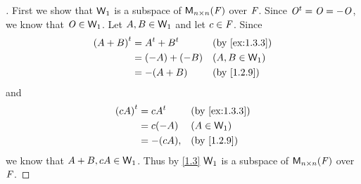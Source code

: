 \begin{proof}[]
	First we show that \(\mathsf{W}_1\) is a subspace of \(\ms[n][n][\F]\) over \(\mathit{F}\).
	Since \({\mathit{O}}^{t} = \mathit{O} = -\mathit{O}\), we know that \(\mathit{O} \in \mathsf{W}_1\).
	Let \(A, B \in \mathsf{W}_1\) and let \(c \in \mathit{F}\).
	Since
	\begin{align*}
		\tp{(A + B)} & = \tp{A} + \tp{B} &  & \by{ex:1.3.3}   \\
		             & = (-A) + (-B)     &  & (A, B \in \W_1) \\
		             & = -(A + B)        &  & \by{1.2.9}
	\end{align*}
	and
	\begin{align*}
		\tp{(cA)} & = c \tp{A} &  & \by{ex:1.3.3} \\
		          & = c (-A)   &  & (A \in \W_1)  \\
		          & = -(cA),   &  & \by{1.2.9}
	\end{align*}
	we know that \(A + B, cA \in \mathsf{W}_1\).
	Thus by \cref{1.3} \(\mathsf{W}_1\) is a subspace of \(\ms[n][n][\F]\) over \(\mathit{F}\).


\end{proof}
